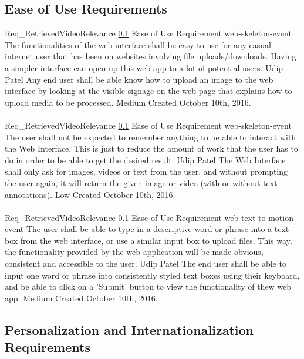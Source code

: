 \documentclass{scrreprt}
\begin{document}
\subsection{Ease of Use Requirements}
\label{req-ease-of-use}

\requirement
{Req_RetrievedVideoRelevance}
{\ref{req-ease-of-use} Ease of Use Requirement}
{web-skeleton-event} %
{The functionalities of the web interface shall be easy to use for any casual internet user that has been on websites involving file uploads/downloads.}
{Having a simpler interface can open up this web app to a lot of potential users.}
{Udip Patel}
{Any end user shall be able know how to upload an image to the web interface by looking at the visible signage on the web-page that explains how to upload media to be processed.}
{Medium}
{Created October 10th, 2016.}
\\ \\

\requirement
{Req_RetrievedVideoRelevance}
{\ref{req-ease-of-use} Ease of Use Requirement}
{web-skeleton-event}
{The user shall not be expected to remember anything to be able to interact with the Web Interface.}
{This is just to reduce the amount of work that the user has to do in order to be able to get the desired result.}
{Udip Patel}
{The Web Interface shall only ask for images, videos or text from the user, and without prompting the user again, it will return the given image or video (with or without text annotations).}
{Low}
{Created October 10th, 2016.}
\\ \\

\requirement
{Req_RetrievedVideoRelevance}
{\ref{req-ease-of-use} Ease of Use Requirement}
{web-text-to-motion-event}
{The user shall be able to type in a descriptive word or phrase into a text box from the web interface, or use a similar input box to upload files.}
{This way, the functionality provided by the web application will be made obvious, consistent and accessible to the user.}
{Udip Patel}
{The end user shall be able to input one word or phrase into consistently styled text boxes using their keyboard, and be able to click on a 'Submit' button to view the functionality of thew web app.}
{Medium}
{Created October 10th, 2016.}

\subsection{Personalization and Internationalization Requirements}
\end{document}
